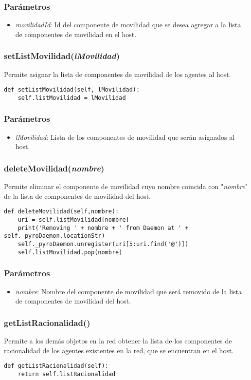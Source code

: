 \documentclass{article}
\begin{document}
\subsubsection*{Parámetros}
\begin{itemize}
\item \textit{movilidadId}: Id del componente de movilidad que se desea agregar a la lista de componentes de movilidad en el host.
\end{itemize}
\subsubsection{\textbf{setListMovilidad}(\textit{lMovilidad})}
Permite asignar la lista de componentes de movilidad de los agentes al host.
\begin{lstlisting}
def setListMovilidad(self, lMovilidad):
	self.listMovilidad = lMovilidad
\end{lstlisting}
\subsubsection*{Parámetros}
\begin{itemize}
\item \textit{lMovilidad}: Lista de los componentes de movilidad que serán asignados al host.
\end{itemize}
\subsubsection{\textbf{deleteMovilidad}(\textit{nombre})}
Permite eliminar el componente de movilidad cuyo nombre coincida con "\textit{nombre}" de la lista de componentes de movilidad del host.
\begin{lstlisting}
def deleteMovilidad(self,nombre):
	uri = self.listMovilidad[nombre]
    print('Removing ' + nombre + ' from Daemon at ' + self._pyroDaemon.locationStr)
	self._pyroDaemon.unregister(uri[5:uri.find('@')])
    self.listMovilidad.pop(nombre)
\end{lstlisting}
\subsubsection*{Parámetros}
\begin{itemize}
\item \textit{nombre}: Nombre del componente de movilidad que será removido de la lista de componentes de movilidad del host.
\end{itemize}
\subsubsection{\textbf{getListRacionalidad}()}
Permite a los demás objetos en la red obtener la lista de los componentes de racionalidad de los agentes existentes en la red, que se encuentran en el host.
\begin{lstlisting}
def getListRacionalidad(self):
	return self.listRacionalidad
\end{lstlisting}
\end{document}
